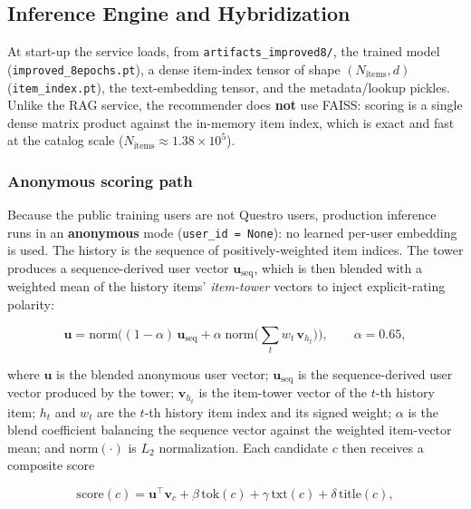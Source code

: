\subsection{Inference Engine and Hybridization}
\label{sec:inference}
At start-up the service loads, from \texttt{artifacts\_improved8/}, the trained model (\texttt{improved\_8epochs.pt}), a dense item-index tensor of shape $(N_{\text{items}}, d)$ (\texttt{item\_index.pt}), the text-embedding tensor, and the metadata/lookup pickles. Unlike the RAG service, the recommender does \textbf{not} use FAISS: scoring is a single dense matrix product against the in-memory item index, which is exact and fast at the catalog scale ($N_{\text{items}}\approx 1.38\times10^{5}$).

\subsubsection{Anonymous scoring path}
Because the public training users are not Questro users, production inference runs in an \textbf{anonymous} mode (\texttt{user\_id = None}): no learned per-user embedding is used. The history is the sequence of positively-weighted item indices. The tower produces a sequence-derived user vector $\mathbf{u}_{\text{seq}}$, which is then blended with a weighted mean of the history items' \emph{item-tower} vectors to inject explicit-rating polarity:

\begin{equation}
\mathbf{u} = \mathrm{norm}\!\Big((1-\alpha)\,\mathbf{u}_{\text{seq}} + \alpha\;\mathrm{norm}\!\big(\textstyle\sum_{t} w_t\,\mathbf{v}_{h_t}\big)\Big),
\qquad \alpha = 0.65,
\label{eq:anonblend}
\end{equation}

where $\mathbf{u}$ is the blended anonymous user vector; $\mathbf{u}_{\text{seq}}$ is the sequence-derived user vector produced by the tower; $\mathbf{v}_{h_t}$ is the item-tower vector of the $t$-th history item; $h_t$ and $w_t$ are the $t$-th history item index and its signed weight; $\alpha$ is the blend coefficient balancing the sequence vector against the weighted item-vector mean; and $\mathrm{norm}(\cdot)$ is $L_2$ normalization. Each candidate $c$ then receives a composite score

\begin{equation}
\mathrm{score}(c) = \mathbf{u}^{\top}\mathbf{v}_c
+ \beta\,\mathrm{tok}(c)
+ \gamma\,\mathrm{txt}(c)
+ \delta\,\mathrm{title}(c),
\label{eq:finalscore}
\end{equation}


